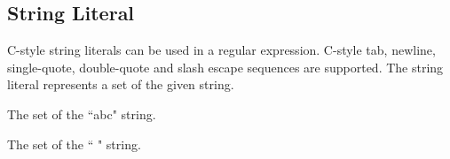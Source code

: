 
\subsection{String Literal}
{
	C-style string literals can be used in a regular expression.
	C-style tab, newline, single-quote, double-quote and slash escape sequences
	are supported.
	The string literal represents a set of the given string.
	
	\begin{itemize}
	{
		\item[\texttt{"abc"}] The set of the ``abc" string.
		
		\item[\texttt{" "}] The set of the `` " string.
	}
	\end{itemize}
}
